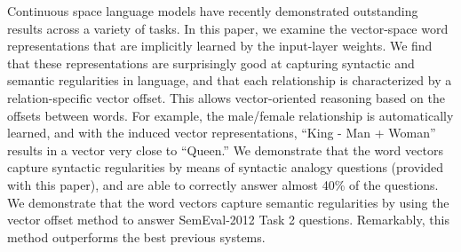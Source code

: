 Continuous space language models have recently demonstrated outstanding results across a variety of tasks. In this paper, we examine the vector-space word
 representations that are implicitly learned by the input-layer weights. We find
 that these representations are surprisingly good at capturing syntactic
 and semantic regularities in language, and that each relationship is
 characterized by a relation-specific vector offset. This allows vector-oriented
 reasoning based on the offsets between words. For example, the male/female
 relationship is automatically learned, and with the induced vector
 representations, ``King - Man + Woman'' results in a vector very close to
 ``Queen.'' We demonstrate that the word vectors capture syntactic
 regularities by means of syntactic analogy questions (provided with this
 paper), and are able to correctly answer almost 40\% of the questions. We
 demonstrate that the word vectors capture semantic regularities by using the
 vector offset method to answer SemEval-2012 Task 2 questions. Remarkably, this
 method outperforms the best previous systems.

